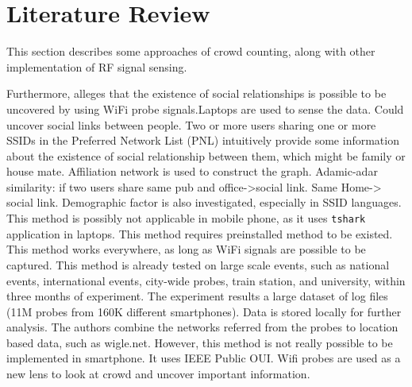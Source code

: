 \documentclass{article}
\begin{document}

\section{Literature Review} %
\label{sec:literature_review}
This section describes some approaches of crowd counting, along with other implementation of RF signal sensing.



Furthermore, \cite{thesis014} alleges that the existence of social relationships is possible to be uncovered by using WiFi probe signals.Laptops are used to sense the data. Could uncover social links between people. Two or more users sharing one or more SSIDs in the Preferred Network List (PNL) intuitively provide some information about the existence of social relationship between them, which might be family or house mate. Affiliation network is used to construct the graph. Adamic-adar similarity: if two users share same pub and office->social link. Same Home-> social link. Demographic factor is also investigated, especially in SSID languages. This method is possibly not applicable in mobile phone, as it uses \texttt{tshark} application in laptops. This method requires preinstalled method to be existed. This method works everywhere, as long as WiFi signals are possible to be captured. This method is already tested on large scale events, such as national events, international events, city-wide probes, train station, and university, within three months of experiment. The experiment results a large dataset of log files (11M probes from 160K different smartphones). Data is stored locally for further analysis.
The authors combine the networks referred from the probes to location based data, such as wigle.net. However, this method is not really possible to be implemented in smartphone. It uses IEEE Public OUI. Wifi probes are used as a new lens to look at crowd and uncover important information.

\end{document}

